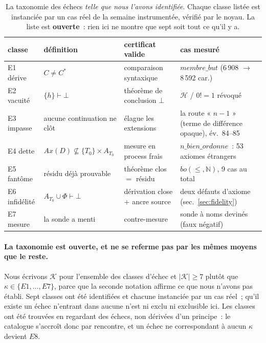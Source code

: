 \documentclass[11pt]{article}
\theoremstyle{remark}\newtheorem{example}{Exemple}
\begin{document}
\begin{table}[h]\centering\footnotesize
\setlength{\tabcolsep}{4.5pt}
\begin{tabular}{lllp{4.3cm}}
\toprule
classe & définition & certificat valide & cas mesuré \\
\midrule
E1 dérive & $C \neq C^\ast$ & comparaison syntaxique & $\mathit{membre\_but}$ (6\,908 $\to$ 8\,592 car.) \\
E2 vacuité & $\{h\} \vdash \bot$ & théorème de conclusion $\bot$ & $\mathcal{H}$ / $0! = 1$ révoqué \\
E3 impasse & aucune continuation ne clôt & élague les extensions & la route « $n{-}1$ » (terme de différence opaque), év.~84--85 \\
E4 dette & $Ax(D) \not\subseteq \{T_0\}{\times}A_{T_0}$ & mesure en process frais & $n\_bien\_ordonne$~: 53 axiomes étrangers \\
E5 fantôme & résidu déjà prouvable & théorème clos $=$ résidu & $bo(\le,\mathbb{N})$, 9 cas au total \\
E6 infidélité & $A_{T_0} \cup \Phi \vdash \bot$ & dérivation close $+$ ancre source & deux défauts d'axiome (sec.~\ref{sec:fidelity}) \\
E7 mesure & la sonde a menti & contre-mesure & sonde à noms devinés (faux négatif) \\
\bottomrule
\end{tabular}
\caption{La taxonomie des échecs \emph{telle que nous l'avons identifiée}. Chaque classe
listée est instanciée par un cas réel de la semaine instrumentée, vérifié par le noyau.
La liste est \textbf{ouverte}~: rien ici ne montre que sept soit tout ce qu'il y a.}
\end{table}

\paragraph{La taxonomie est ouverte, et ne se referme pas par les mêmes moyens que le
reste.} Nous écrivons $\mathcal{K}$ pour l'ensemble des classes d'échec et
$|\mathcal{K}| \ge 7$ plutôt que $\kappa \in \{E1,\dots,E7\}$, parce que la seconde
notation affirme ce que nous n'avons pas établi. Sept classes ont été identifiées et
chacune instanciée par un cas réel~; qu'il existe un échec n'entrant dans aucune n'est ni
exclu ni exclusible ici. Les classes ont été trouvées en regardant des échecs, non
dérivées d'un principe~: le catalogue s'accroît donc par rencontre, et un échec ne
correspondant à aucun $\kappa$ devient $E8$.
\end{document}
